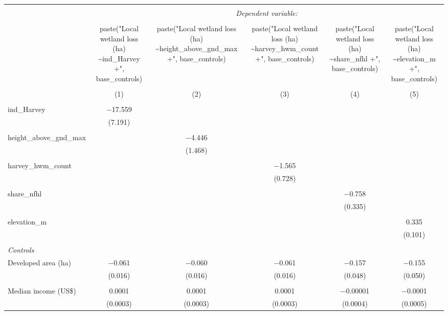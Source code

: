 \begin{tabular}{@{\extracolsep{5pt}}lccccc} 
\\[-1.8ex]\hline 
\hline \\[-1.8ex] 
 & \multicolumn{5}{c}{\textit{Dependent variable:}} \\ 
\cline{2-6} 
\\[-1.8ex] & paste("Local wetland loss (ha) \textasciitilde ind\_Harvey +", base\_controls) & paste("Local wetland loss (ha) \textasciitilde height\_above\_gnd\_max +", base\_controls) & paste("Local wetland loss (ha) \textasciitilde harvey\_hwm\_count +", base\_controls) & paste("Local wetland loss (ha) \textasciitilde share\_nfhl +", base\_controls) & paste("Local wetland loss (ha) \textasciitilde elevation\_m +", base\_controls) \\ 
\\[-1.8ex] & (1) & (2) & (3) & (4) & (5)\\ 
\hline \\[-1.8ex] 
 ind\_Harvey & $-$17.559 &  &  &  &  \\ 
  & (7.191) &  &  &  &  \\ 
  & & & & & \\ 
 height\_above\_gnd\_max &  & $-$4.446 &  &  &  \\ 
  &  & (1.468) &  &  &  \\ 
  & & & & & \\ 
 harvey\_hwm\_count &  &  & $-$1.565 &  &  \\ 
  &  &  & (0.728) &  &  \\ 
  & & & & & \\ 
 share\_nfhl &  &  &  & $-$0.758 &  \\ 
  &  &  &  & (0.335) &  \\ 
  & & & & & \\ 
 elevation\_m &  &  &  &  & 0.335 \\ 
  &  &  &  &  & (0.101) \\ 
  & & & & & \\ 
 \emph{Controls} \\ Developed area (ha) & $-$0.061 & $-$0.060 & $-$0.061 & $-$0.157 & $-$0.155 \\ 
  & (0.016) & (0.016) & (0.016) & (0.048) & (0.050) \\ 
  & & & & & \\ 
 Median income (US\$) & 0.0001 & 0.0001 & 0.0001 & $-$0.00001 & $-$0.0001 \\ 
  & (0.0003) & (0.0003) & (0.0003) & (0.0004) & (0.0005) \\ 

\end{tabular}

